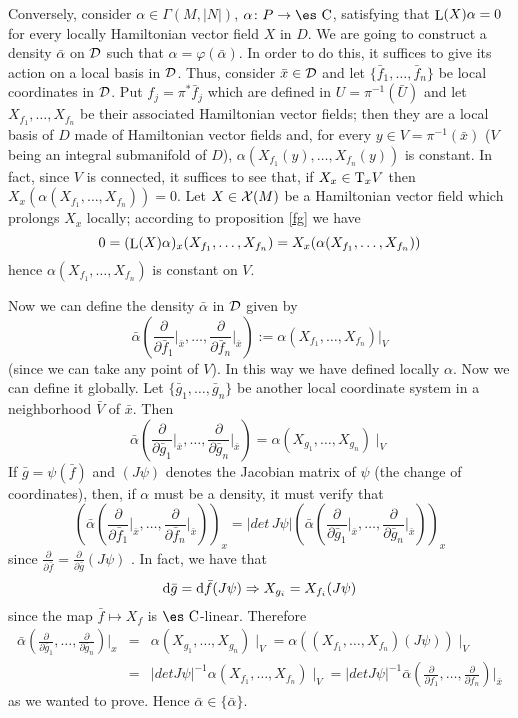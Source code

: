 \documentclass[12pt]{article}
\theoremstyle{plain}
\def\beann{\begin{eqnarray*}}
\def\eeann{\end{eqnarray*}}
\def\dst{\(}
\def\derpar#1#2{\frac{\partial{#1}}{\partial{#2}}}
\def\qed{\ifvmode\removelastskip\fi
{\unskip\nobreak\hfil\penalty50\hbox{}\nobreak\hfil
\hbox{\vrule height1.2ex width1.2ex}\parfillskip=0pt
\finalhyphendemerits=0 \par\smallskip}}
\def\d{{\rm d}}
\def\Complex{\mbox{\es C}}
\def\Tan{{\rm T}}
\def\Lie{\mathop{\rm L}\nolimits}
\begin{document}
Conversely, consider $\alpha \in \Gamma(M,| N |)$, $\alpha \colon P \to
\Complex$,
satisfying that $\Lie(X)\alpha = 0$
for every locally Hamiltonian vector field $X$ in $D$.
We are going to construct a density $\bar \alpha$  on ${\cal D}$ such
that
$\alpha = \varphi (\bar \alpha)$. In order to do this,
it suffices to give its action on a local basis in ${\cal D}$.
Thus, consider $\bar x \in {\cal D}$ and let $\{ \bar f_1,\ldots , \bar
f_n \}$
be local coordinates in ${\cal D}$. Put $f_j = \pi^*\bar f_j$
which are defined in $U = \pi^{-1}(\bar U)$ and let
$X_{f_1}, \ldots ,X_{f_n}$ be their associated Hamiltonian vector
fields;
then they are a local basis of $D$ made of Hamiltonian vector fields
and,
for every $y \in V = \pi^{-1} (\bar x)$ ($V$ being an integral
submanifold of $D$),
$\alpha (X_{f_1}(y), \ldots ,X_{f_n}(y))$ is constant. In fact,
since $V$ is connected, it suffices to see that, if $X_x \in \Tan_xV$
then $X_x(\alpha (X_{f_1}, \ldots ,X_{f_n}))=0$.
Let $X \in {\cal X}(M)$ be a Hamiltonian vector field
which prolongs $X_x$ locally; according to proposition \ref{fg}
we have
$$
0 = (\Lie(X)\alpha)_x(X_{f_1}, \ldots ,X_{f_n}) =
X_x(\alpha(X_{f_1}, \ldots ,X_{f_n}))
$$
hence $\alpha (X_{f_1}, \ldots ,X_{f_n})$ is constant on $V$.

Now we  can define the density $\bar \alpha$ in ${\cal D}$ given
by $$ \bar \alpha \left(\derpar{}{\bar f_1}\Big\vert_{\bar
x},\ldots , \derpar{}{\bar f_n}\Big\vert_{\bar x}\right) := \alpha
(X_{f_1}, \ldots ,X_{f_n}) \Big\vert_V $$ (since we can take any
point of $V$). In this way we have defined locally $\alpha$. Now
we can define it globally. Let $\{\bar g_1, \ldots ,\bar g_n \}$
be another local coordinate system in a neighborhood $\bar V$ of
$\bar x$. Then $$ \bar \alpha\left(\derpar{}{\bar
g_1}\Big\vert_{\bar x},\ldots , \derpar{}{\bar g_n}\Big\vert_{\bar
x}\right) = \alpha (X_{g_1}, \ldots ,X_{g_n}) \mid_V $$ If $\bar g
= \psi (\bar f)$ and $(J\psi )$ denotes the Jacobian matrix of
$\psi$ (the change of coordinates), then, if $\alpha$ must be a
density, it must verify that $$ \left(\bar
\alpha\left(\derpar{}{\bar f_1}\Big\vert_{\bar x},\ldots ,
\derpar{}{\bar f_n}\Big\vert_{\bar x}\right)\right)_x = |det\,
J\psi| \left(\bar \alpha\left(\derpar{}{\bar g_1}\Big\vert_{\bar
x},\ldots , \derpar{}{\bar g_n}\Big\vert_{\bar x}\right)\right)_x
$$ since \dst\derpar{}{\bar f} = \derpar{}{\bar g} (J\psi )\) . In
fact, we have that $$ \d \bar g = \d \bar f (J\psi ) \Rightarrow
X_{g_i} = X_{f_i} (J\psi) $$ since the map $\bar f\mapsto X_f$ is
$\Complex$-linear. Therefore \beann \bar
\alpha\left(\derpar{}{\bar g_1},\ldots ,\derpar{}{\bar
g_n}\right)\Big\vert_x &=& \alpha (X_{g_1}, \ldots ,X_{g_n})
\mid_V= \alpha ((X_{f_1}, \ldots ,X_{f_n})(J\psi )) \mid_V
\\ &=&
|detJ\psi |^{-1}\alpha (X_{f_1}, \ldots ,X_{f_n}) \mid_V=
|detJ\psi |^{-1} \bar \alpha\left(\derpar{}{f_1}, \ldots
,\derpar{}{f_n}\right)\Big\vert_{\bar x}
\eeann
as we wanted to prove. Hence $\bar \alpha \in \{\bar \alpha \}$.
\qed
\end{document}
